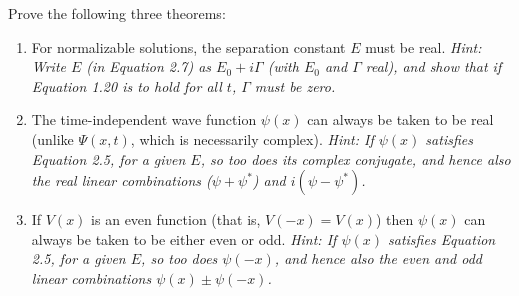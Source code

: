 \documentclass[en, oneside]{vivi}
\begin{document}
\begin{prob}
    Prove the following three theorems:
    \begin{enumerate}[label=(\alph*)]
        \item For normalizable solutions, the separation constant $E$ must be real. 
        \textit{Hint: Write $E$ (in Equation 2.7) as $E_0 + i\Gamma$ (with $E_0$ and $\Gamma$ real), 
        and show that if Equation 1.20 is to hold for all $t$, $\Gamma$ must be zero.}
        \item The time-independent wave function $\psi(x)$ can always be taken to be real (unlike $\Psi(x, t)$, which is necessarily complex). 
        \textit{Hint: If $\psi(x)$ satisfies Equation 2.5, for a given $E$, so too does its complex conjugate, 
        and hence also the real linear combinations ($\psi + \psi^*$) and $i(\psi - \psi^*)$.}
        \item If $V(x)$ is an even function (that is, $V(-x) = V(x)$) then $\psi(x)$ can always be taken to be either even or odd. 
        \textit{Hint: If $\psi(x)$ satisfies Equation 2.5, for a given $E$, so too does $\psi(-x)$, 
        and hence also the even and odd linear combinations $\psi(x) \pm \psi(-x)$.}
    \end{enumerate}
\end{prob}
\end{document}
